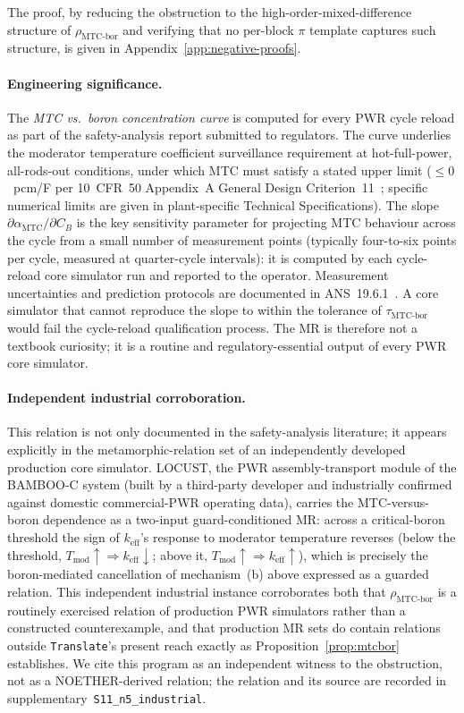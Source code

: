 \documentclass[manuscript]{acmart}
\begin{document}
The proof, by reducing the obstruction to the high-order-mixed-difference structure of $\rho_{\mathrm{MTC\text{-}bor}}$ and verifying that no per-block $\pi$ template captures such structure, is given in Appendix~\ref{app:negative-proofs}.

\paragraph{Engineering significance.}
The \emph{MTC vs.\ boron concentration curve} is computed for every PWR cycle reload as part of the safety-analysis report submitted to regulators. The curve underlies the moderator temperature coefficient surveillance requirement at hot-full-power, all-rods-out conditions, under which MTC must satisfy a stated upper limit ($\le 0$~pcm/\textdegree{}F per 10~CFR~50 Appendix~A General Design Criterion~11~\cite{NRC10CFR50AppA}; specific numerical limits are given in plant-specific Technical Specifications). The slope $\partial \alpha_{\mathrm{MTC}}/\partial C_{B}$ is the key sensitivity parameter for projecting MTC behaviour across the cycle from a small number of measurement points (typically four-to-six points per cycle, measured at quarter-cycle intervals): it is computed by each cycle-reload core simulator run and reported to the operator. Measurement uncertainties and prediction protocols are documented in ANS~19.6.1~\cite{ANS196_1}. A core simulator that cannot reproduce the slope to within the tolerance of $\tau_{\mathrm{MTC\text{-}bor}}$ would fail the cycle-reload qualification process. The MR is therefore not a textbook curiosity; it is a routine and regulatory-essential output of every PWR core simulator.

\paragraph{Independent industrial corroboration.}
This relation is not only documented in the safety-analysis literature; it appears explicitly in the metamorphic-relation set of an independently developed production core simulator. LOCUST, the PWR assembly-transport module of the BAMBOO-C system (built by a third-party developer and industrially confirmed against domestic commercial-PWR operating data), carries the MTC-versus-boron dependence as a two-input guard-conditioned MR: across a critical-boron threshold the sign of $k_{\mathrm{eff}}$'s response to moderator temperature reverses (below the threshold, $T_{\mathrm{mod}} \uparrow \Rightarrow k_{\mathrm{eff}} \downarrow$; above it, $T_{\mathrm{mod}} \uparrow \Rightarrow k_{\mathrm{eff}} \uparrow$), which is precisely the boron-mediated cancellation of mechanism~(b) above expressed as a guarded relation. This independent industrial instance corroborates both that $\rho_{\mathrm{MTC\text{-}bor}}$ is a routinely exercised relation of production PWR simulators rather than a constructed counterexample, and that production MR sets do contain relations outside \texttt{Translate}'s present reach exactly as Proposition~\ref{prop:mtcbor} establishes. We cite this program as an independent witness to the obstruction, not as a NOETHER-derived relation; the relation and its source are recorded in supplementary~\texttt{S11\_n5\_industrial}.
\end{document}
